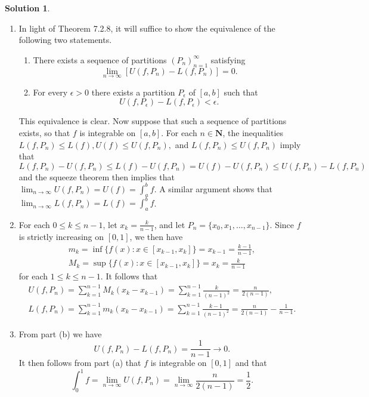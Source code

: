 \documentclass[12pt]{article}
\theoremstyle{definition}
\theoremstyle{exercise}
\theoremstyle{solution}
\newtheorem*{solution}{Solution}
\newcommand{\N}{\mathbf{N}}
\begin{document}
\begin{solution}
    \begin{enumerate}
        \item In light of Theorem 7.2.8, it will suffice to show the equivalence of the following two statements.
        \begin{enumerate}[label=(\roman*)]
            \item There exists a sequence of partitions \( (P_n)_{n=1}^{\infty} \) satisfying
            \[
                \lim_{n \to \infty} [U(f, P_n) - L(f, P_n)] = 0.
            \]
            
            \item For every \( \epsilon > 0 \) there exists a partition \( P_{\epsilon} \) of \( [a, b] \) such that
            \[
                U(f, P_{\epsilon}) - L(f, P_{\epsilon}) < \epsilon.
            \]
        \end{enumerate}
        This equivalence is clear. Now suppose that such a sequence of partitions exists, so that \( f \) is integrable on \( [a, b] \). For each \( n \in \N \), the inequalities \( L(f, P_n) \leq L(f), U(f) \leq U(f, P_n), \) and \( L(f, P_n) \leq U(f, P_n) \) imply that
        \[
            L(f, P_n) - U(f, P_n) \leq L(f) - U(f, P_n) = U(f) - U(f, P_n) \leq U(f, P_n) - L(f, P_n)
        \]
        and the squeeze theorem then implies that \( \lim_{n \to \infty} U(f, P_n) = U(f) = \int_a^b f \). A similar argument shows that \( \lim_{n \to \infty} L(f, P_n) = L(f) = \int_a^b f \).

        \item For each \( 0 \leq k \leq n - 1 \), let \( x_k = \tfrac{k}{n-1} \), and let \( P_n = \{ x_0, x_1, \ldots, x_{n-1} \} \). Since \( f \) is strictly increasing on \( [0, 1] \), we then have
        \begin{gather*}
            m_k = \inf \{ f(x) : x \in [x_{k-1}, x_k] \} = x_{k-1} = \frac{k - 1}{n - 1}, \\[2mm]
            M_k = \sup \{ f(x) : x \in [x_{k-1}, x_k] \} = x_k = \frac{k}{n - 1}
        \end{gather*}
        for each \( 1 \leq k \leq n - 1 \). It follows that
        \begin{gather*}
            U(f, P_n) = \sum_{k=1}^{n-1} M_k (x_k - x_{k-1}) = \sum_{k=1}^{n-1} \frac{k}{(n - 1)^2} = \frac{n}{2 (n - 1)}, \\[2mm]
            L(f, P_n) = \sum_{k=1}^{n-1} m_k (x_k - x_{k-1}) = \sum_{k=1}^{n-1} \frac{k - 1}{(n - 1)^2} = \frac{n}{2 (n - 1)} - \frac{1}{n - 1}.
        \end{gather*}

        \item From part (b) we have
        \[
            U(f, P_n) - L(f, P_n) = \frac{1}{n - 1} \to 0.
        \]
        It then follows from part (a) that \( f \) is integrable on \( [0, 1] \) and that
        \[
            \int_0^1 f = \lim_{n \to \infty} U(f, P_n) = \lim_{n \to \infty} \frac{n}{2 (n - 1)} = \frac{1}{2}.
        \]
    \end{enumerate}
\end{solution}
\end{document}
